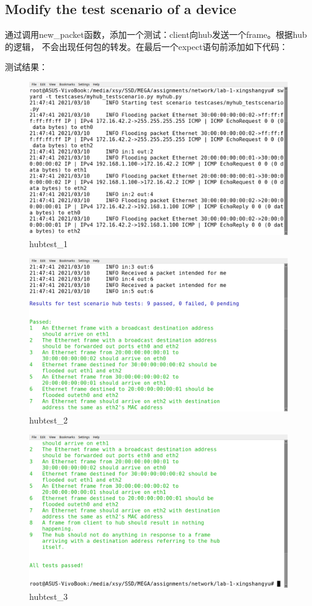 \documentclass[12pt,a4paper,UTF8]{article}
\begin{document}
\subsection{Modify the test scenario of a device}
通过调用new\_packet函数，添加一个测试：client向hub发送一个frame。根据hub的逻辑，
不会出现任何包的转发。在最后一个expect语句前添加如下代码：

测试结果：
\begin{figure}[htbp]
	\centering
	\includegraphics[width=\textwidth]{hub_test_1}
	\caption{hubtest\_1}
\end{figure}
\begin{figure}[htbp]
	\centering
	\includegraphics[width=\textwidth]{hub_test_2}
	\caption{hubtest\_2}
\end{figure}
\begin{figure}[htbp]
	\centering
	\includegraphics[width=\textwidth]{hub_test_3}
	\caption{hubtest\_3}
\end{figure}
\end{document}
